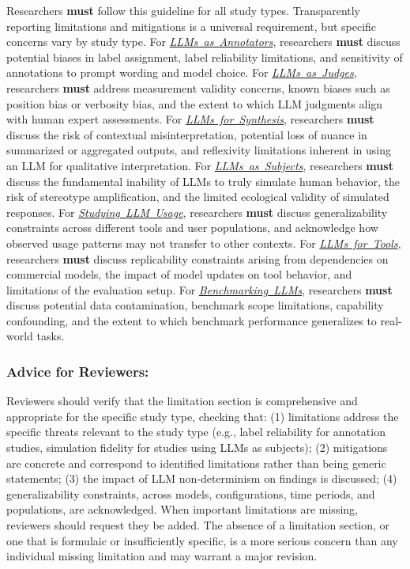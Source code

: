 \documentclass[smallextended]{svjour3}
\newcommand{\must}{\textbf{must}\xspace}
\newcommand{\annotators}{\hyperref[sec:llms-as-annotators]{\mbox{\emph{LLMs as Annotators}}}\xspace}
\newcommand{\judges}{\hyperref[sec:llms-as-judges]{\mbox{\emph{LLMs as Judges}}}\xspace}
\newcommand{\synthesis}{\hyperref[sec:llms-for-synthesis]{\mbox{\emph{LLMs for Synthesis}}}\xspace}
\newcommand{\subjects}{\hyperref[sec:llms-as-subjects]{\mbox{\emph{LLMs as Subjects}}}\xspace}
\newcommand{\llmusage}{\hyperref[sec:studying-llm-usage-in-software-engineering]{\mbox{\emph{Studying LLM Usage}}}\xspace}
\newcommand{\newtools}{\hyperref[sec:llms-for-new-software-engineering-tools]{\mbox{\emph{LLMs for Tools}}}\xspace}
\newcommand{\benchmarkingtasks}{\hyperref[sec:benchmarking-llms-for-software-engineering-tasks]{\mbox{\emph{Benchmarking LLMs}}}\xspace}
\newcommand{\annotators}{\href{/study-types/annotators/}{\emph{LLMs as Annotators}}\xspace}
\newcommand{\judges}{\href{/study-types/judges/}{\emph{LLMs as Judges}}\xspace}
\newcommand{\synthesis}{\href{/study-types/synthesis/}{\emph{LLMs for Synthesis}}\xspace}
\newcommand{\subjects}{\href{/study-types/subjects/}{\emph{LLMs as Subjects}}\xspace}
\newcommand{\llmusage}{\href{/study-types/usage/}{\emph{Studying LLM Usage}}\xspace}
\newcommand{\newtools}{\href{/study-types/tools/}{\emph{LLMs for Tools}}\xspace}
\newcommand{\benchmarkingtasks}{\href{/study-types/benchmarking/}{\emph{Benchmarking LLMs}}\xspace}
\newcommand{\guidelinesubsubsection}[1]{\subsubsection{\bfseries #1:}}
\newcommand{\guidelinesubsubsection}[1]{\subsubsection{#1}}
\begin{document}
Researchers \must follow this guideline for all study types. Transparently reporting limitations and mitigations is a universal requirement, but specific concerns vary by study type.
For \annotators, researchers \must discuss potential biases in label assignment, label reliability limitations, and sensitivity of annotations to prompt wording and model choice.
For \judges, researchers \must address measurement validity concerns, known biases such as position bias or verbosity bias, and the extent to which LLM judgments align with human expert assessments.
For \synthesis, researchers \must discuss the risk of contextual misinterpretation, potential loss of nuance in summarized or aggregated outputs, and reflexivity limitations inherent in using an LLM for qualitative interpretation.
For \subjects, researchers \must discuss the fundamental inability of LLMs to truly simulate human behavior, the risk of stereotype amplification, and the limited ecological validity of simulated responses.
For \llmusage, researchers \must discuss generalizability constraints across different tools and user populations, and acknowledge how observed usage patterns may not transfer to other contexts.
For \newtools, researchers \must discuss replicability constraints arising from dependencies on commercial models, the impact of model updates on tool behavior, and limitations of the evaluation setup.
For \benchmarkingtasks, researchers \must discuss potential data contamination, benchmark scope limitations, capability confounding, and the extent to which benchmark performance generalizes to real-world tasks.

\guidelinesubsubsection{Advice for Reviewers}

Reviewers should verify that the limitation section is comprehensive and appropriate for the specific study type, checking that:
(1) limitations address the specific threats relevant to the study type (e.g., label reliability for annotation studies, simulation fidelity for studies using LLMs as subjects);
(2) mitigations are concrete and correspond to identified limitations rather than being generic statements;
(3) the impact of LLM non-determinism on findings is discussed;
(4) generalizability constraints, across models, configurations, time periods, and populations, are acknowledged.
When important limitations are missing, reviewers should request they be added. The absence of a limitation section, or one that is formulaic or insufficiently specific, is a more serious concern than any individual missing limitation and may warrant a major revision.
\end{document}
